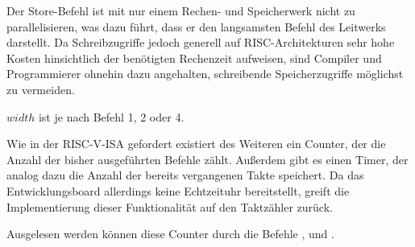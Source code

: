
Der Store-Befehl ist mit nur einem Rechen- und Speicherwerk nicht zu
parallelisieren, was dazu f\"uhrt, dass er den langsamsten Befehl des
Leitwerks darstellt. Da Schreibzugriffe jedoch generell auf RISC-Architekturen
sehr hohe Kosten hinsichtlich der ben\"otigten Rechenzeit aufweisen, sind
Compiler und Programmierer ohnehin dazu angehalten, schreibende
Speicherzugriffe m\"oglichst zu vermeiden.

{\(width\) ist je nach Befehl 1, 2 oder 4.
}

Wie in der RISC-V-ISA gefordert existiert des Weiteren ein Counter, der die
Anzahl der bisher ausgef\"uhrten Befehle z\"ahlt. Au\ss{}erdem gibt es einen
Timer, der analog dazu die Anzahl der bereits vergangenen Takte speichert. Da
das Entwicklungsboard allerdings keine Echtzeituhr bereitstellt, greift die
Implementierung dieser Funktionalit\"at auf den Taktz\"ahler zur\"uck.

Ausgelesen werden k\"onnen diese Counter durch die Befehle
\nolinebreak{},  und .


\newpage
